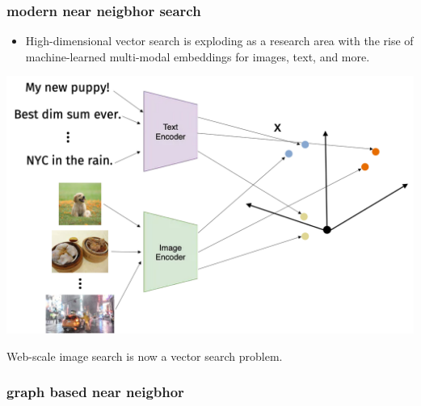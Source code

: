 \documentclass[compress]{beamer}
\begin{document}
\begin{frame}[t]
	\frametitle{modern near neigbhor search}
	\begin{itemize}
		\item High-dimensional vector search is exploding as a research area with the rise of machine-learned multi-modal embeddings for images, text, and more. 
	\end{itemize}
	\begin{center}
		\vspace{-.5em}
				\includegraphics[width=.8\textwidth]{multimodal_embeddings.png}
				\vspace{-.5em}
	\end{center}
	Web-scale image search is now a vector search problem. 
\end{frame}

\begin{frame}[t]
	\frametitle{graph based near neigbhor}
	
\end{frame}
\end{document}
